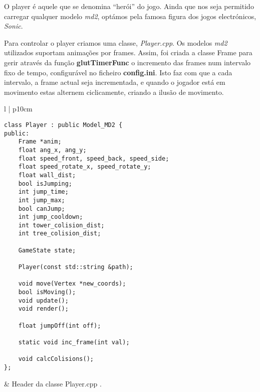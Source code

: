 
O player é aquele que se denomina ``herói'' do jogo. Ainda que nos seja permitido carregar qualquer modelo \textit{md2}, optámos pela famosa figura dos jogos electrónicos, \textit{Sonic}.

Para controlar o player criamos uma classe, \textit{Player.cpp}.
Os modelos \textit{md2} utilizados suportam animações por frames. Assim, foi criada a classe Frame para gerir através da função \textbf{glutTimerFunc} o incremento das frames num intervalo fixo de tempo, configurável no ficheiro \textbf{config.ini}. Isto faz com que a cada intervalo, a frame actual seja incrementada, e quando o jogador está em movimento estas alternem ciclicamente, criando a ilusão de movimento.

\-
\begin{tabular} {l | p{10cm}}
\begin{lstlisting}
class Player : public Model_MD2 {
public:
	Frame *anim;
	float ang_x, ang_y;
	float speed_front, speed_back, speed_side;
	float speed_rotate_x, speed_rotate_y;
	float wall_dist;
	bool isJumping;
	int jump_time;
	int jump_max;
	bool canJump;
	int jump_cooldown;
	int tower_colision_dist;
	int tree_colision_dist;

	GameState state;

	Player(const std::string &path);

	void move(Vertex *new_coords);
	bool isMoving();
	void update();
	void render();

	float jumpOff(int off);

	static void inc_frame(int val);

	void calcColisions();
};
\end{lstlisting} 
&
Header da classe Player.cpp .\\
\end{tabular}
